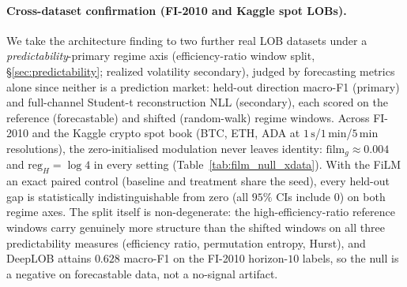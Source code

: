 
\paragraph{Cross-dataset confirmation (FI-2010 and Kaggle spot LOBs).}
We take the architecture finding to two further real LOB datasets under a
\emph{predictability}-primary regime axis (efficiency-ratio window split,
\S\ref{sec:predictability}; realized volatility secondary), judged by forecasting
metrics alone since neither is a prediction market: held-out direction macro-F1
(primary) and full-channel Student-t reconstruction NLL (secondary), each scored on the
reference (forecastable) and shifted (random-walk) regime windows. Across FI-2010 and
the Kaggle crypto spot book (BTC, ETH, ADA at $1\,\mathrm{s}$/$1\,\mathrm{min}$/$5\,
\mathrm{min}$ resolutions), the zero-initialised modulation never leaves identity:
$\mathrm{film}_g \approx 0.004$ and $\mathrm{reg}_H = \log 4$ in every setting
(Table~\ref{tab:film_null_xdata}). With the FiLM an exact paired control (baseline and
treatment share the seed), every held-out gap is statistically indistinguishable from
zero (all $95\%$ CIs include $0$) on both regime axes. The split itself is non-degenerate:
the high-efficiency-ratio reference windows carry genuinely more structure than the
shifted windows on all three predictability measures (efficiency ratio, permutation
entropy, Hurst), and DeepLOB attains $0.628$ macro-F1 on the FI-2010 horizon-$10$ labels,
so the null is a negative on forecastable data, not a no-signal artifact.

